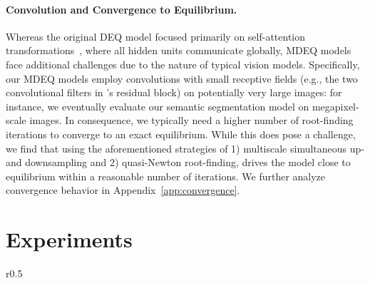 \documentclass{article}
\begin{document}
\vspace{-.1in}
\paragraph{Convolution and Convergence to Equilibrium.} Whereas the original DEQ model focused primarily on self-attention transformations~\cite{vaswani2017attention}, where all hidden units communicate globally, MDEQ models face additional challenges due to the nature of typical vision models. Specifically, our MDEQ models employ convolutions with small receptive fields (e.g., the two  convolutional filters in 's residual block) on potentially very large images: for instance, we eventually evaluate our semantic segmentation model on megapixel-scale images. In consequence, we typically need a higher number of root-finding iterations to converge to an exact equilibrium. While this does pose a challenge, we find that using the aforementioned strategies of 1) multiscale simultaneous up- and downsampling and 2) quasi-Newton root-finding, drives the model close to equilibrium within a reasonable number of iterations. We further analyze convergence behavior in Appendix~\ref{app:convergence}.


\section{Experiments}
\label{sec:experiments}

\begin{wraptable}{r}{0.5\textwidth}
    \vspace{-.17in}
    \label{table:cifar-10}
    \vspace{-.04in}
    \vspace{-.1in}
\end{wraptable}
\end{document}
